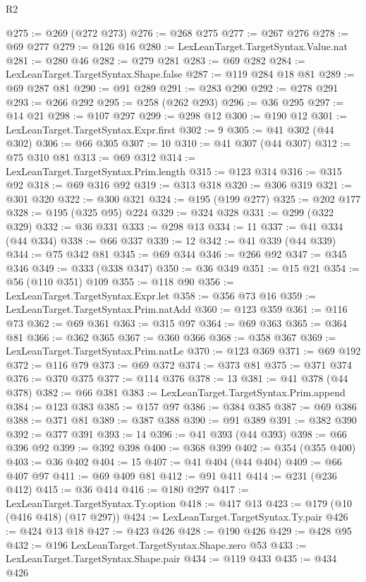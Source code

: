 \begin{lexlean}{R2}
\begin{coremodule}
{{{{{{{{{{{{{{{{{{{{{{{{{{{{{{{{{{{{{{{{{{{{{{@275 := @269 (@272 @273)
@276 := @268 @275
@277 := @267 @276
@278 := @69 @277
@279 := @126 @16
@280 := LexLeanTarget.TargetSyntax.Value.nat
@281 := @280 @46
@282 := @279 @281
@283 := @69 @282
@284 := LexLeanTarget.TargetSyntax.Shape.false
@287 := @119 @284 @18 @81
@289 := @69 @287 @81
@290 := @91 @289
@291 := @283 @290
@292 := @278 @291
@293 := @266 @292
@295 := @258 (@262 @293)
@296 := @36 @295
@297 := @14 @21
@298 := @107 @297
@299 := @298 @12
@300 := @190 @12
@301 := LexLeanTarget.TargetSyntax.Expr.first
@302 := 9
@305 := @41 @302 (@44 @302)
@306 := @66 @305
@307 := 10
@310 := @41 @307 (@44 @307)
@312 := @75 @310 @81
@313 := @69 @312
@314 := LexLeanTarget.TargetSyntax.Prim.length
@315 := @123 @314
@316 := @315 @92
@318 := @69 @316 @92
@319 := @313 @318
@320 := @306 @319
@321 := @301 @320
@322 := @300 @321
@324 := @195 (@199 @277)
@325 := @202 @177
@328 := @195 (@325 @95) @224
@329 := @324 @328
@331 := @299 (@322 @329)
@332 := @36 @331
@333 := @298 @13
@334 := 11
@337 := @41 @334 (@44 @334)
@338 := @66 @337
@339 := 12
@342 := @41 @339 (@44 @339)
@344 := @75 @342 @81
@345 := @69 @344
@346 := @266 @92
@347 := @345 @346
@349 := @333 (@338 @347)
@350 := @36 @349
@351 := @15 @21
@354 := @56 (@110 @351) @109
@355 := @118 @90
@356 := LexLeanTarget.TargetSyntax.Expr.let
@358 := @356 @73 @16
@359 := LexLeanTarget.TargetSyntax.Prim.natAdd
@360 := @123 @359
@361 := @116 @73
@362 := @69 @361
@363 := @315 @97
@364 := @69 @363
@365 := @364 @81
@366 := @362 @365
@367 := @360 @366
@368 := @358 @367
@369 := LexLeanTarget.TargetSyntax.Prim.natLe
@370 := @123 @369
@371 := @69 @192
@372 := @116 @79
@373 := @69 @372
@374 := @373 @81
@375 := @371 @374
@376 := @370 @375
@377 := @114 @376
@378 := 13
@381 := @41 @378 (@44 @378)
@382 := @66 @381
@383 := LexLeanTarget.TargetSyntax.Prim.append
@384 := @123 @383
@385 := @157 @97
@386 := @384 @385
@387 := @69 @386
@388 := @371 @81
@389 := @387 @388
@390 := @91 @389
@391 := @382 @390
@392 := @377 @391
@393 := 14
@396 := @41 @393 (@44 @393)
@398 := @66 @396 @92
@399 := @392 @398
@400 := @368 @399
@402 := @354 (@355 @400)
@403 := @36 @402
@404 := 15
@407 := @41 @404 (@44 @404)
@409 := @66 @407 @97
@411 := @69 @409 @81
@412 := @91 @411
@414 := @231 (@236 @412)
@415 := @36 @414
@416 := @180 @297
@417 := LexLeanTarget.TargetSyntax.Ty.option
@418 := @417 @13
@423 := @179 (@10 (@416 @418) (@17 @297))
@424 := LexLeanTarget.TargetSyntax.Ty.pair
@426 := @424 @13 @18
@427 := @423 @426
@428 := @190 @426
@429 := @428 @95
@432 := @196 LexLeanTarget.TargetSyntax.Shape.zero @53
@433 := LexLeanTarget.TargetSyntax.Shape.pair
@434 := @119 @433
@435 := @434 @426
}}}}}}}}}}}}}}}}}}}}}}}}}}}}}}}}}}}}}}}}}}}}}}
\end{coremodule}
\end{lexlean}
